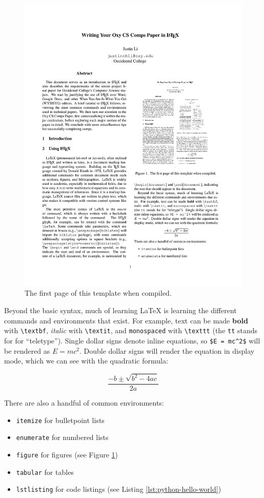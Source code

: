 \documentclass[10pt,twocolumn]{article}
\begin{document}
\begin{figure}
    \centering
    \includegraphics[width=.95\linewidth]{recursion.png}
    \caption{
        The first page of this template when compiled.
    }
    \label{fig:first-page}
\end{figure}

Beyond the basic syntax, much of learning LaTeX is learning the different commands and environments that exist.
For example, text can be made \textbf{bold} with \texttt{\textbackslash textbf}, \textit{italic} with \texttt{\textbackslash textit}, and \texttt{monospaced} with \texttt{\textbackslash texttt} (the \texttt{tt} stands for for ``teletype'').
Single dollar signs denote inline equations, so \texttt{\$E = mc\textasciicircum 2\$} will be rendered as $E = mc^2$.
Double dollar signs will render the equation in display mode, which we can see with the quadratic formula:

$$\frac{{-b \pm \sqrt {b^2 - 4ac} }}{{2a}}$$

There are also a handful of common environments:

\begin{itemize}
    \item \texttt{itemize} for bulletpoint lists
    \item \texttt{enumerate} for numbered lists
    \item \texttt{figure} for figures (see Figure \ref{fig:first-page})
    \item \texttt{tabular} for tables
    \item \texttt{lstlisting} for code listings (see Listing \ref{lst:python-hello-world})
\end{itemize}
\end{document}
